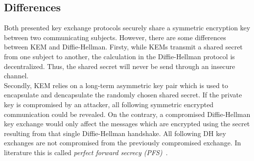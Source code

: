 \subsection{Differences}
Both presented key exchange protocols securely share a symmetric encryption key between two communicating subjects. However, there are some differences between \gls{KEM} and Diffie-Hellman. Firsty, while \glspl{KEM} transmit a shared secret from one subject to another, the calculation in the Diffie-Hellman protocol is decentralized. Thus, the shared secret will never be send through an insecure channel.\\
Secondly, \gls{KEM} relies on a long-term asymmetric key pair which is used to encapsulate and dencapsulate the randomly chosen shared secret. If the private key is compromised by an attacker, all following symmetric encrypted communication could be revealed. On the contrary, a compromised Diffie-Hellman key exchange would only affect the messages which are encrypted using the secret resulting from that single Diffie-Hellman handshake. All following \gls{DH} key exchanges are not compromised from the previously compromised exchange. In literature this is called \textit{perfect forward secrecy (\gls{PFS})}~\parencite{ITSicherheit}.

